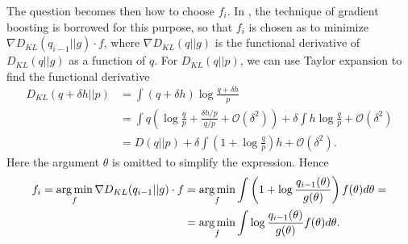 The question becomes then how to choose $f_i$. In \cite{Guo_2016}, the technique of gradient boosting \cite{Friedman_2001} is borrowed for this purpose, so that $f_i$ is chosen as to minimize $\nabla D_{KL} (q_{i-1}||g)  \cdot f$, where $\nabla D_{KL}(q || g)$ is the functional derivative of $D_{KL}(q || g)$ as a function of $q$. For $D_{KL}(q || p)$, we can use Taylor expansion to find the functional derivative
\begin{equation}
\begin{split}
 D_{KL}(q + \delta h || p) & = \int (q + \delta h) \log \frac{q + \delta h}{p} \\
					  & = \int q \left(\log \frac{q}{p} + \frac{\delta h/p}{q/p} + \mathcal{O}(\delta^2) \right) + \delta \int h \log \frac{q}{p} + \mathcal{O}(\delta^2) \\
					  & = D(q||p) + \delta \int \left(1 + \log \frac{q}{p}\right) h + \mathcal{O}(\delta^2).
\end{split}			  
\end{equation}
Here the argument $\theta$ is omitted to simplify the expression. Hence 
\begin{equation} \label{idealklgrad}
\begin{split}
f_i = \operatorname*{arg\,min}_{f} \nabla D_{KL}(q_{i-1} || g) \cdot f & = \operatorname*{arg\,min}_{f} \int \left(1 + \log \frac{q_{i-1}(\theta)}{g(\theta)}\right) f(\theta) d \theta = \\
& = \operatorname*{arg\,min}_{f} \int \log \frac{q_{i-1}(\theta)}{g(\theta)} f(\theta) d\theta.
\end{split}
\end{equation}

